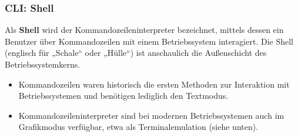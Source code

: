 \subsubsection*{CLI: Shell}
Als \textbf{Shell} wird der Kommandozeileninterpreter bezeichnet, mittels dessen ein Benutzer über Kommandozeilen mit einem Betriebssystem interagiert. Die Shell (englisch für „Schale“ oder „Hülle“) ist anschaulich die Außenschicht des Betriebssystemkerns.
\begin{itemize}
	\item Kommandozeilen waren historisch die ersten Methoden zur Interaktion mit Betriebssystemen und benötigen lediglich den Textmodus. 
	\item Kommandozeileninterpreter sind bei modernen Betriebssystemen auch im Grafikmodus verfügbar, etwa als Terminalemulation (siehe unten).
\end{itemize}

